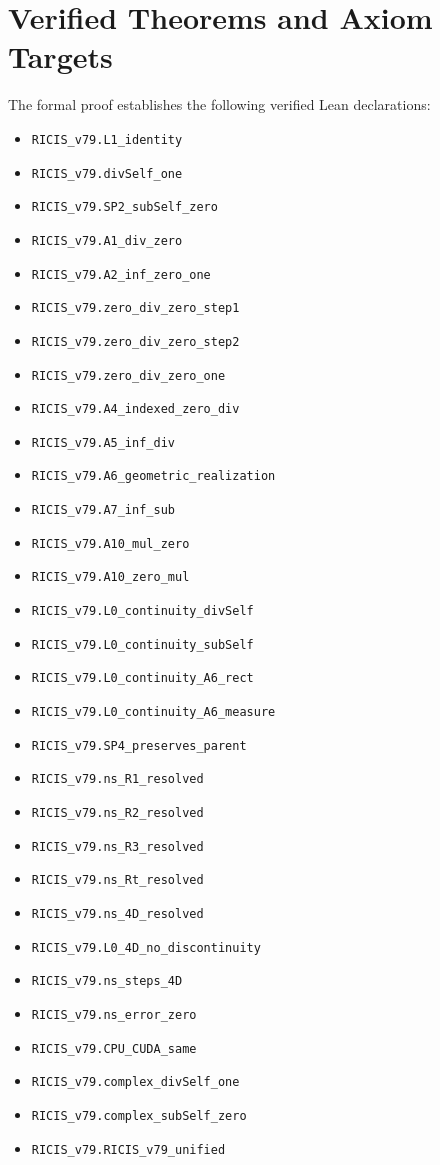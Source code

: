 \documentclass[11pt,a4paper]{article}
\begin{document}
\section{Verified Theorems and Axiom Targets}
The formal proof establishes the following verified Lean declarations:
\begin{itemize}
  \item \texttt{RICIS_v79.L1_identity}
  \item \texttt{RICIS_v79.divSelf_one}
  \item \texttt{RICIS_v79.SP2_subSelf_zero}
  \item \texttt{RICIS_v79.A1_div_zero}
  \item \texttt{RICIS_v79.A2_inf_zero_one}
  \item \texttt{RICIS_v79.zero_div_zero_step1}
  \item \texttt{RICIS_v79.zero_div_zero_step2}
  \item \texttt{RICIS_v79.zero_div_zero_one}
  \item \texttt{RICIS_v79.A4_indexed_zero_div}
  \item \texttt{RICIS_v79.A5_inf_div}
  \item \texttt{RICIS_v79.A6_geometric_realization}
  \item \texttt{RICIS_v79.A7_inf_sub}
  \item \texttt{RICIS_v79.A10_mul_zero}
  \item \texttt{RICIS_v79.A10_zero_mul}
  \item \texttt{RICIS_v79.L0_continuity_divSelf}
  \item \texttt{RICIS_v79.L0_continuity_subSelf}
  \item \texttt{RICIS_v79.L0_continuity_A6_rect}
  \item \texttt{RICIS_v79.L0_continuity_A6_measure}
  \item \texttt{RICIS_v79.SP4_preserves_parent}
  \item \texttt{RICIS_v79.ns_R1_resolved}
  \item \texttt{RICIS_v79.ns_R2_resolved}
  \item \texttt{RICIS_v79.ns_R3_resolved}
  \item \texttt{RICIS_v79.ns_Rt_resolved}
  \item \texttt{RICIS_v79.ns_4D_resolved}
  \item \texttt{RICIS_v79.L0_4D_no_discontinuity}
  \item \texttt{RICIS_v79.ns_steps_4D}
  \item \texttt{RICIS_v79.ns_error_zero}
  \item \texttt{RICIS_v79.CPU_CUDA_same}
  \item \texttt{RICIS_v79.complex_divSelf_one}
  \item \texttt{RICIS_v79.complex_subSelf_zero}
  \item \texttt{RICIS_v79.RICIS_v79_unified}
\end{itemize}
\end{document}
